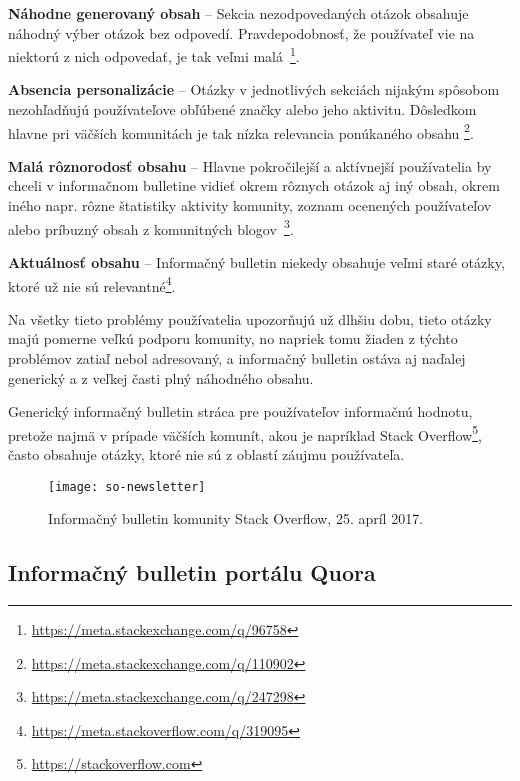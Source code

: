 \begin{my_itemize}
  \item{\textbf{Náhodne generovaný obsah} -- Sekcia nezodpovedaných otázok obsahuje náhodný výber otázok bez odpovedí.
        Pravdepodobnosť, že používateľ vie na niektorú z nich odpovedať, je tak veľmi malá~\footnote{\url{https://meta.stackexchange.com/q/96758}}.}
  \item{\textbf{Absencia personalizácie} -- Otázky v jednotlivých sekciách nijakým spôsobom nezohľadňujú používateľove
        obľúbené značky alebo jeho aktivitu. Dôsledkom hlavne pri väčších komunitách je tak nízka relevancia ponúkaného obsahu
        \footnote{\url{https://meta.stackexchange.com/q/110902}}.}
  \item{\textbf{Malá rôznorodosť obsahu} -- Hlavne pokročilejší a aktívnejší používatelia by chceli v informačnom bulletine vidieť
        okrem rôznych otázok aj iný obsah, okrem iného napr. rôzne štatistiky aktivity komunity, zoznam ocenených používateľov
        alebo príbuzný obsah z komunitných blogov~\footnote{\url{https://meta.stackexchange.com/q/247298}}.}
  \item{\textbf{Aktuálnosť obsahu} -- Informačný bulletin niekedy obsahuje veľmi staré otázky, ktoré už nie sú relevantné\footnote{\url{https://meta.stackoverflow.com/q/319095}}.}
\end{my_itemize}

Na všetky tieto problémy používatelia upozorňujú už dlhšiu dobu, tieto otázky majú pomerne veľkú podporu komunity,
no napriek tomu žiaden z týchto problémov zatiaľ nebol adresovaný, a informačný bulletin ostáva aj naďalej generický
a z veľkej časti plný náhodného obsahu.

Generický informačný bulletin stráca pre používateľov informačnú hodnotu, pretože
najmä v prípade väčších komunít, akou je napríklad Stack Overflow\footnote{ \url{https://stackoverflow.com}}, často obsahuje
otázky, ktoré nie sú z oblastí záujmu používateľa.


\begin{figure}[H]\begin{center}
\texttt{[image: so-newsletter]}
\caption{Informačný bulletin komunity Stack Overflow, 25. apríl 2017.\label{fig:so-newsletter}}\end{center}
\end{figure}

\subsection{Informačný bulletin portálu Quora}

